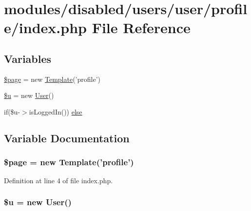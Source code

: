\hypertarget{disabled_2users_2user_2profile_2index_8php}{\section{modules/disabled/users/user/profile/index.php File Reference}
\label{disabled_2users_2user_2profile_2index_8php}
}
\subsection*{Variables}
\begin{DoxyCompactItemize}
\item 
\hyperlink{disabled_2users_2user_2profile_2index_8php_a0a44e6760141442bb439b1ab1395d8ff}{\$page} = new \hyperlink{class_template}{Template}('profile')
\item 
\hyperlink{disabled_2users_2user_2profile_2index_8php_ad9bcfd597eba04db946451e8368a1f05}{\$u} = new \hyperlink{class_user}{User}()
\item 
if(\$u-\/$>$is\-Logged\-In()) \hyperlink{disabled_2users_2user_2profile_2index_8php_a422753eb4fdd2194fafd5f10508e8695}{else}
\end{DoxyCompactItemize}


\subsection{Variable Documentation}
\hypertarget{disabled_2users_2user_2profile_2index_8php_a0a44e6760141442bb439b1ab1395d8ff}{
\subsubsection[{\$page}]{\setlength{\rightskip}{0pt plus 5cm}\$page = new {\bf Template}('profile')}}\label{disabled_2users_2user_2profile_2index_8php_a0a44e6760141442bb439b1ab1395d8ff}


Definition at line 4 of file index.\-php.

\hypertarget{disabled_2users_2user_2profile_2index_8php_ad9bcfd597eba04db946451e8368a1f05}{
\subsubsection[{\$u}]{\setlength{\rightskip}{0pt plus 5cm}\$u = new {\bf User}()}}\label{disabled_2users_2user_2profile_2index_8php_ad9bcfd597eba04db946451e8368a1f05}



